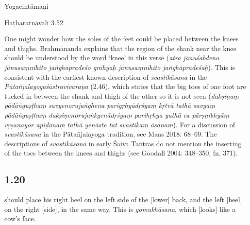 \begin{ekdosis}
\begin{sources}[hp01_019]
\end{sources}

\begin{testimonia}[hp01_019]
Yogacintāmaṇi

\begin{versinnote}
\end{versinnote}

Haṭharatnāvalī 3.52

\begin{versinnote}
\end{versinnote}

\end{testimonia}

\begin{philcomm}[hp01_019]        
One might wonder how the soles of the feet could be placed between the knees and thighs. Brahmānanda explains that the region of the shank near the knee should be understood by the word ‘knee’ in this verse (\emph{atra jānuśabdena jānusaṃnihito jaṅghāpradeśo grāhyaḥ jānusaṃnihito jaṅghāpradeśaḥ}). This is consistent with the earliest known description of \emph{svastikāsana} in the \emph{Pātañjalayogaśāstravivaraṇa} (2.46), which states that the big toes of one foot are tucked in between the shank and thigh of the other so it is not seen (\emph{dakṣiṇaṃ pādāṅguṣṭhaṃ savyenorujaṅghena parigṛhyādṛśyaṃ kṛtvā tathā savyaṃ pādāṅguṣṭhuṃ dakṣiṇenorujaṅkgenādṛśyaṃ parihṛhya yathā ca pārṣṇibhyāṃ vṛṣaṇayor apīḍanaṃ tathā yenāste tat svastikam āsanam}). For a discussion of \emph{svastikāsana} in the Pātañjalayoga tradition, see Maas 2018: 68–69. The descriptions of \emph{svastikāsana} in early Śaiva Tantras do not mention the inserting of the toes between the knees and thighs (see Goodall 2004: 348–350, fn. 371).
\end{philcomm}

\subsection*{1.20}
\begin{translation} should place his right heel on the left side of the [lower] back, and the left [heel] on the right [side], in the same way. This is \emph{gomukhāsana}, which [looks] like a cow's face.
\end{translation}


\end{ekdosis}
